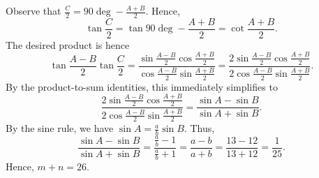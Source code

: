 Observe that $\frac{C}{2} = 90\deg - \frac{A + B}{2}$. Hence, \[\tan \frac{C}{2} = \tan{90\deg - \frac{A + B}{2}} = \cot \frac{A + B}{2}.\] The desired product is hence \[\tan \frac{A-B}{2} \tan \frac{C}{2} = \frac{\sin \frac{A-B}{2} \cos \frac{A+B}{2}}{\cos \frac{A-B}{2} \sin \frac{A+B}{2}} = \frac{2\sin \frac{A-B}{2} \cos \frac{A+B}{2}}{2\cos \frac{A-B}{2} \sin \frac{A+B}{2}}.\] By the product-to-sum identities, this immediately simplifies to \[\frac{2\sin \frac{A-B}{2} \cos \frac{A+B}{2}}{2\cos \frac{A-B}{2} \sin \frac{A+B}{2}} = \frac{\sin A - \sin B}{\sin A + \sin B}.\] By the sine rule, we have $\sin A = \frac{a}{b} \sin B$. Thus, \[\frac{\sin A - \sin B}{\sin A + \sin B} = \frac{\frac{a}{b} - 1}{\frac{a}{b} + 1} = \frac{a - b}{a + b} = \frac{13 - 12}{13 + 12} = \frac{1}{25}.\] Hence, $m + n = 26$.
